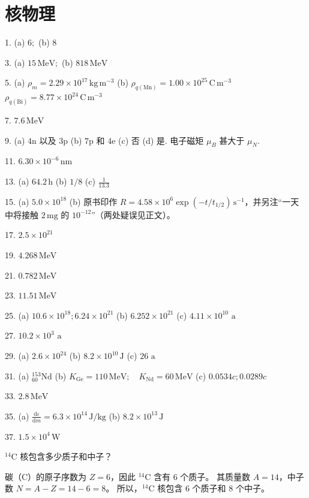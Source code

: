 


\chapter{核物理}

\begin{oddanswers}
1. (a) $6;$ (b) $8$

3. (a) $15\,\mathrm{MeV};$ (b) $818\,\mathrm{MeV}$

5. (a) $\rho_m = 2.29 \times 10^{17}\,\mathrm{kg\,m^{-3}}$
(b) $\rho_{q(\mathrm{Mn})} = 1.00 \times 10^{25}\,\mathrm{C\,m^{-3}}$
$\rho_{q(\mathrm{Bi})} = 8.77 \times 10^{24}\,\mathrm{C\,m^{-3}}$

7. $7.6\,\mathrm{MeV}$

9. (a) $4\text{n}$ 以及 $3\text{p}$
(b) $7\text{p}$ 和 $4\text{e}$
(c) 否
(d) 是. 电子磁矩 $\mu_B$ 甚大于 $\mu_N$.

11. $6.30 \times 10^{-6}\,\mathrm{nm}$

13. (a) $64.2\,\mathrm{h}$
(b) $1/8$
(c) $\frac{1}{13.3}$

15. (a) $5.0 \times 10^{18}$
(b) 原书印作 $R = 4.58 \times 10^6 \exp(-t/t_{1/2})\,\mathrm{s^{-1}}$，并另注“一天中将接触 $2\,\mathrm{mg}$ 的 $10^{-12}$”（两处疑误见正文）。

17. $2.5 \times 10^{21}$

19. $4.268\,\mathrm{MeV}$

21. $0.782\,\mathrm{MeV}$

23. $11.51\,\mathrm{MeV}$

25. (a) $10.6 \times 10^{18}; 6.24 \times 10^{21}$
(b) $6.252 \times 10^{21}$
(c) $4.11 \times 10^{10}\text{ a}$

27. $10.2 \times 10^3\text{ a}$

29. (a) $2.6 \times 10^{24}$
(b) $8.2 \times 10^{10}\,\mathrm{J}$
(c) $26\text{ a}$

31. (a) $^{153}_{60}\text{Nd}$
(b) $K_{\text{Ge}} = 110\,\mathrm{MeV}; \quad K_{\text{Nd}} = 60\,\mathrm{MeV}$
(c) $0.0534c; 0.0289c$

33. $2.8\,\mathrm{MeV}$

35. (a) $\frac{\mathrm{d}\varepsilon}{\mathrm{d}m} = 6.3 \times 10^{14}\,\mathrm{J/kg}$
(b) $8.2 \times 10^{13}\,\mathrm{J}$

37. $1.5 \times 10^4\,\mathrm{W}$
\end{oddanswers}

\begin{exercise}\label{ex:29.1}
$^{14}\mathrm{C}$ 核包含多少质子和中子？
\end{exercise}
\begin{solution}
碳（$\mathrm{C}$）的原子序数为 $Z = 6$，因此 $^{14}\mathrm{C}$ 含有 $6$ 个质子。
其质量数 $A = 14$，中子数 $N = A - Z = 14 - 6 = 8$。
所以，$^{14}\mathrm{C}$ 核包含 $6$ 个质子和 $8$ 个中子。
\end{solution}

